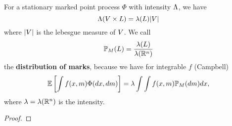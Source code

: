 \begin{lemma}[Campbell]\label{lem: Campbell}
	For a stationary marked point process \(\Phi\) with intensity
	\(\Lambda\), we have	
	\[
		\Lambda(V \times L) = \lambda(L) |V|
	\]
	where \(|V|\) is the lebesgue measure of \(V\). We call
	\[
		\mathbb{P}_M(L) = \frac{\lambda(L)}{\lambda(\mathbb{R}^n)}
	\]
	the \textbf{distribution of marks}, because we have for integrable \(f\)
	(Campbell)
	\[
		\mathbb{E}\left[\int f(x,m) \Phi(dx,dm)\right]
		= \lambda \int \int f(x,m) \mathbb{P}_M(dm) dx,
	\]
	where \(\lambda=\lambda(\mathbb{R}^n)\) is the intensity.
\end{lemma}

\begin{proof}
\end{proof}
